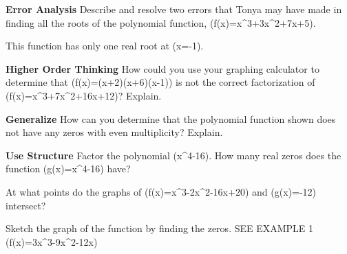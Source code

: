 \documentclass{article}
\newenvironment{practice}[2]{}{}        %
\newcommand{\answer}[1]{}               %
\newcommand{\placeholder}[2]{}          %
\newcommand{\te}[1]{}                   %
\begin{document}
\begin{practice}{7}{2}
\textbf{Error Analysis} Describe and resolve two errors that Tonya may have made in finding all the roots of the polynomial function, (f(x)=x^3+3x^2+7x+5).
\placeholder{graph}{Tonya's red increasing cubic crossing x-axis at -1; x labels -4,-2,O,2,4 and y labels 8,4,-4,-8; a red X marks the work as incorrect.}
This function has only one real root at (x=-1).
\answer{Tonya neglected to use synthetic division to factor the polynomial in order to find its complex roots, (-1+2i) and (-1-2i).}
\te{The printed statement about one real root is true; the prompt asks for two errors while the key identifies the omitted complex roots.}
\end{practice}
\begin{practice}{8}{2}
\textbf{Higher Order Thinking} How could you use your graphing calculator to determine that (f(x)=(x+2)(x+6)(x-1)) is not the correct factorization of (f(x)=x^3+7x^2+16x+12)? Explain.
\answer{Graph them simultaneously on the graphing calculator to see if they coincide.}
\end{practice}
\begin{practice}{9}{1}
\textbf{Generalize} How can you determine that the polynomial function shown does not have any zeros with even multiplicity? Explain.
\placeholder{graph}{Red quartic with both ends up, crossing near x=-1 and flattening while crossing at x=2; minimum near (0,-8); x labels -4,-2,O,2,4; y labels 8,4,-4,-8.}
\answer{When a graph has a multiplicity of a zero that is even, the graph only touches the (x)-axis, and turns back without crossing. That never occurs in the graph of this polynomial function.}
\end{practice}
\begin{practice}{10}{2}
\textbf{Use Structure} Factor the polynomial (x^4-16). How many real zeros does the function (g(x)=x^4-16) have?
\answer{two real zeros at 2 and (-2)}
\end{practice}
\begin{practice}{11}{1}
At what points do the graphs of (f(x)=x^3-2x^2-16x+20) and (g(x)=-12) intersect?
\answer{((-4,-12)), ((2,-12)), ((4,-12))}
\end{practice}
\begin{practice}{12}{1}
Sketch the graph of the function by finding the zeros. SEE EXAMPLE 1
(f(x)=3x^3-9x^2-12x)
\placeholder{graph}{Printed answer 12: red cubic crossing x-axis near -3,1,4, local maximum near (-1.4,20) and minimum near (2.6,-12); x labels -4,-2,O,2,4; y labels 40,-20,-40.}
\answer{See graph.}
\te{The printed graph has the zeros of item 13, not item 12; retained under its printed number.}
\end{practice}
\end{document}
